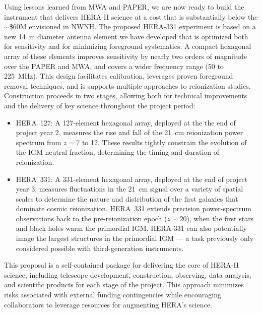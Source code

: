 \documentclass[preprint]{aastex}
\begin{document}
Using lessons learned from MWA and PAPER, 
we are now ready to build the instrument
that delivers HERA-II science at a cost that is substantially below the $\sim$\$60M envisioned in NWNH.
The proposed HERA-331 experiment is based on
a new 14~m diameter antenna element we have developed that is
optimized both for sensitivity and for minimizing foreground systematics.  
A compact hexagonal array of these elements 
improves sensitivity by nearly two orders of magnitude 
over the PAPER and MWA, and covers a wider frequency range (50 to 225~MHz).
This design facilitates calibration, leverages proven foreground removal techniques, and is supports
multiple approaches to reionization studies. 
Construction proceeds in two stages, allowing both for technical improvements and the delivery of 
key science throughout the project period: 

\begin{itemize}[noitemsep,nolistsep]

\item HERA~127: A 127-element hexagonal array, deployed at the
the end of project year 2, measures the rise and fall of the
21~cm reionization power spectrum from $z = 7$ to 12. These results tightly
constrain the evolution of the IGM neutral fraction, determining
the timing and duration of reionization. %

\item HERA~331: A 331-element hexagonal array, deployed at the end of project year 3,
measures fluctuations in the 21~cm signal over a variety of spatial
scales to determine the nature and distribution of the first galaxies
that dominate cosmic reionization. HERA~331 extends precision
power-spectrum observations back to the pre-reionization epoch ($z \sim 20$), 
when the first stars and black holes warm the primordial IGM. HERA-331 can also potentially 
image the largest structures in the primordial
IGM --- a task previously only considered possible with third-generation
instruments. 

\end{itemize}

\noindent
This proposal is a self-contained package for delivering the core of HERA-II science,
including telescope development, construction, observing, data analysis,
and scientific products for each stage of the project.  
This approach minimizes
risks associated with external funding contingencies while encouraging
collaborators to leverage resources for augmenting HERA's science.
\end{document}
